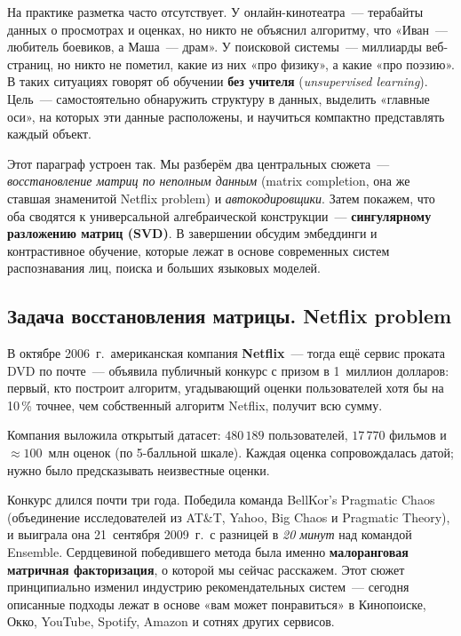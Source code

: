 На практике разметка часто отсутствует. У онлайн-кинотеатра~--- терабайты
данных о просмотрах и оценках, но никто не объяснил алгоритму, что
«Иван~--- любитель боевиков, а Маша~--- драм». У поисковой системы~---
миллиарды веб-страниц, но никто не пометил, какие из них «про физику», а
какие «про поэзию». В таких ситуациях говорят об обучении \textbf{без
учителя} (\emph{unsupervised learning}). Цель~--- самостоятельно
обнаружить структуру в данных, выделить «главные оси», на которых эти
данные расположены, и научиться компактно представлять каждый объект.

Этот параграф устроен так. Мы разберём два центральных сюжета~---
\emph{восстановление матриц по неполным данным} (matrix completion, она же ставшая
знаменитой Netflix problem) и \emph{автокодировщики}. Затем покажем,
что оба сводятся к универсальной алгебраической конструкции~---
\textbf{сингулярному разложению матриц (SVD)}. В завершении обсудим
эмбеддинги и контрастивное обучение, которые лежат в основе современных
систем распознавания лиц, поиска и больших языковых моделей.

\subsection{Задача восстановления матрицы. Netflix problem}
\label{ssec:netflix}

\begin{historybox}
В октябре 2006~г.\ американская компания \textbf{Netflix}~--- тогда ещё
сервис проката DVD по почте~--- объявила публичный конкурс с призом в
1~миллион долларов: первый, кто построит алгоритм, угадывающий оценки
пользователей хотя бы на 10\,\% точнее, чем собственный алгоритм Netflix,
получит всю сумму.

Компания выложила открытый датасет: $480\,189$ пользователей, $17\,770$
фильмов и $\approx 100$~млн оценок (по 5-балльной шкале). Каждая оценка
сопровождалась датой; нужно было предсказывать неизвестные оценки.

Конкурс длился почти три года. Победила команда BellKor's Pragmatic
Chaos (объединение исследователей из AT\&T, Yahoo, Big Chaos и
Pragmatic Theory), и выиграла она 21~сентября 2009~г.\ с разницей в
\emph{20 минут} над командой Ensemble. Сердцевиной победившего метода
была именно \textbf{малоранговая матричная факторизация}, о которой
мы сейчас расскажем. Этот сюжет принципиально изменил индустрию
рекомендательных систем~--- сегодня описанные подходы лежат в основе
«вам может понравиться» в Кинопоиске, Окко, YouTube, Spotify, Amazon и
сотнях других сервисов.
\end{historybox}


